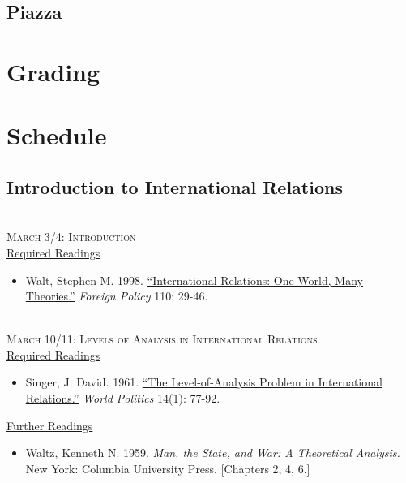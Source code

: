 \documentclass[11pt]{article}
\begin{document}
\subsection*{Piazza}


\section*{Grading}


\newpage
\section*{Schedule}

\vspace{2mm}
\subsection*{Introduction to International Relations}

~\\
\textsc{March 3/4: Introduction} \\

\noindent \underline{Required Readings}

\begin{itemize}
\item Walt, Stephen M. 1998. \href{http://www.jstor.org/stable/1149275}{``International Relations: One World, Many Theories.''} \textit{Foreign Policy} 110: 29-46.
\end{itemize}

~\\
\noindent \textsc{March 10/11: Levels of Analysis in International Relations} \\

\noindent \underline{Required Readings}

\begin{itemize}
\item Singer, J. David. 1961. \href{http://www.jstor.org/stable/2009557}{``The Level-of-Analysis Problem in International Relations.''} \textit{World Politics} 14(1): 77-92.
\end{itemize}

\noindent \underline{Further Readings}

\begin{itemize}
\item Waltz, Kenneth N. 1959. \textit{Man, the State, and War: A Theoretical Analysis.} New York: Columbia University Press. [Chapters 2, 4, 6.]
\end{itemize}
\end{document}
